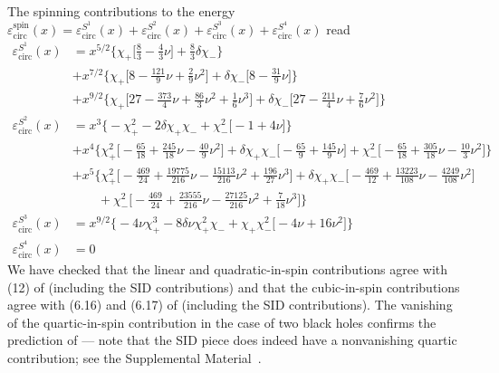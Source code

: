\documentclass[prd,superscriptaddress,preprintnumbers,tightenlines,nofootinbib, eqsecnum]{revtex4-2}
\newcommand{\nn}{\nonumber}
\begin{document}
The spinning contributions to the energy $\varepsilon_\text{circ}^\text{spin}(x) = \varepsilon_{\text{circ}}^{S^1}(x) +\varepsilon_{\text{circ}}^{S^2}(x) +\varepsilon_{\text{circ}}^{S^3}(x) +\varepsilon_{\text{circ}}^{S^4}(x) $ read
\begin{subequations}
\begin{align}
\varepsilon_{\text{circ}}^{S^1}(x) &= x^{5/2}\Bigg\{\chi_{+}\Bigg[\frac{8}{3} - \frac{4}{3} \nu\Bigg] + \frac{8}{3} \delta\chi_{-}\Bigg\} \nn \\
& + x^{7/2}\Bigg\{\chi_{+}\Bigg[8 - \frac{121}{9} \nu + \frac{2}{9} \nu^{2}\Bigg] + \delta\chi_{-}\Bigg[8 - \frac{31}{9} \nu\Bigg]\Bigg\} \nn \\
& + x^{9/2}\Bigg\{\chi_{+}\Bigg[27 - \frac{373}{4} \nu + \frac{86}{3} \nu^{2} + \frac{1}{6} \nu^{3}\Bigg] + \delta\chi_{-}\Bigg[27 - \frac{211}{4} \nu + \frac{7}{6} \nu^{2}\Bigg]\Bigg\}\\
\varepsilon_{\text{circ}}^{S^2}(x) &= x^{3}\Bigg\{-\chi_{+}^2 - 2 \delta\chi_{+}\chi_{-} + \chi_{-}^2\Bigg[-1 + 4 \nu\Bigg]\Bigg\} \nn \\
& + x^{4}\Bigg\{\chi_{+}^2\Bigg[-\frac{65}{18} + \frac{245}{18} \nu - \frac{40}{9} \nu^{2}\Bigg] + \delta\chi_{+}\chi_{-}\Bigg[-\frac{65}{9} + \frac{145}{9} \nu\Bigg] + \chi_{-}^2\Bigg[-\frac{65}{18} + \frac{305}{18} \nu - \frac{10}{3} \nu^{2}\Bigg]\Bigg\} \nn \\
& + x^{5}\Bigg\{\chi_{+}^2\Bigg[-\frac{469}{24} + \frac{19775}{216} \nu - \frac{15113}{216} \nu^{2} + \frac{196}{27} \nu^{3}\Bigg] + \delta\chi_{+}\chi_{-}\Bigg[-\frac{469}{12} + \frac{13223}{108} \nu - \frac{4249}{108} \nu^{2}\Bigg] \nn\\
&\qquad + \chi_{-}^2\Bigg[-\frac{469}{24} + \frac{23555}{216} \nu - \frac{27125}{216} \nu^{2} + \frac{7}{18} \nu^{3}\Bigg]\Bigg\}\\
\varepsilon_{\text{circ}}^{S^3}(x) &= x^{9/2}\Bigg\{-4 \nu\chi_{+}^3 - 8 \delta \nu\chi_{+}^2\chi_{-} + \chi_{+}\chi_{-}^2\Bigg[-4 \nu + 16 \nu^{2}\Bigg]\Bigg\}\\
\varepsilon_{\text{circ}}^{S^4}(x) &= 0
\end{align}
\end{subequations}
We have checked that the linear and quadratic-in-spin contributions agree with (12) of \cite{Cho:2022syn} (including the SID contributions) and that the cubic-in-spin contributions agree with (6.16) and (6.17) of \cite{Marsat:2014xea} (including the SID contributions). The vanishing of the quartic-in-spin contribution in the case of two black holes confirms the prediction of \cite{Siemonsen:2017yux} --- note that the SID piece does indeed have a nonvanishing quartic contribution; see the Supplemental Material~\cite{Supplemental}.
\end{document}
